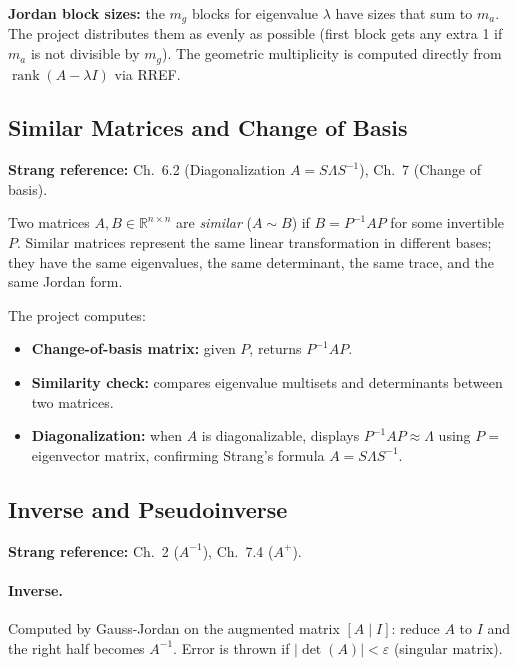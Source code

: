 \documentclass[12pt, a4paper]{article}
\newcommand{\R}{\mathbb{R}}
\newcommand{\rank}{\operatorname{rank}}
\newcommand{\Ap}{A^{+}}
\begin{document}
\noindent
\textbf{Jordan block sizes:} the $m_g$ blocks for eigenvalue $\lambda$ have
sizes that sum to $m_a$.  The project distributes them as evenly as possible
(first block gets any extra 1 if $m_a$ is not divisible by $m_g$).
The geometric multiplicity is computed directly from $\rank(A - \lambda I)$
via RREF.

\subsection{Similar Matrices and Change of Basis}

\textbf{Strang reference:} Ch.\ 6.2 (Diagonalization $A = S\Lambda S^{-1}$),
Ch.\ 7 (Change of basis).

Two matrices $A, B \in \R^{n \times n}$ are \emph{similar} ($A \sim B$) if
$B = P^{-1}AP$ for some invertible $P$.  Similar matrices represent the same
linear transformation in different bases; they have the same eigenvalues,
the same determinant, the same trace, and the same Jordan form.

\medskip
\noindent
The project computes:
\begin{itemize}[noitemsep]
  \item \textbf{Change-of-basis matrix:} given $P$, returns $P^{-1}AP$.
  \item \textbf{Similarity check:} compares eigenvalue multisets and
        determinants between two matrices.
  \item \textbf{Diagonalization:} when $A$ is diagonalizable, displays
        $P^{-1}AP \approx \Lambda$ using $P =$ eigenvector matrix, confirming
        Strang's formula $A = S\Lambda S^{-1}$.
\end{itemize}

\subsection{Inverse and Pseudoinverse}

\textbf{Strang reference:} Ch.\ 2 ($A^{-1}$), Ch.\ 7.4 ($\Ap$).

\paragraph{Inverse.} Computed by Gauss-Jordan on the augmented matrix
$[A \mid I]$: reduce $A$ to $I$ and the right half becomes $A^{-1}$.
Error is thrown if $|\det(A)| < \varepsilon$ (singular matrix).
\end{document}
